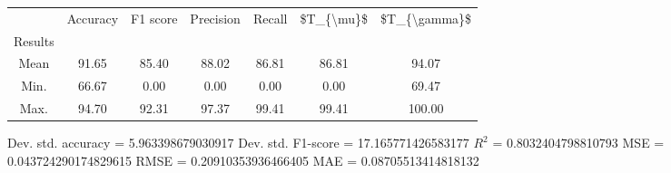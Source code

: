 \begin{tabular}{|c|c|c|c|c|c|c|}
\toprule
{} &  Accuracy &  F1 score &  Precision &  Recall &  \$T\_\{\textbackslash mu\}\$ &  \$T\_\{\textbackslash gamma\}\$ \\
Results &           &           &            &         &            &               \\
\hline
Mean    &     91.65 &     85.40 &      88.02 &   86.81 &      86.81 &         94.07 \\
Min.    &     66.67 &      0.00 &       0.00 &    0.00 &       0.00 &         69.47 \\
Max.    &     94.70 &     92.31 &      97.37 &   99.41 &      99.41 &        100.00 \\
\bottomrule
\end{tabular}

 Dev. std. accuracy = 5.963398679030917
 Dev. std. F1-score = 17.165771426583177
 $R^2$ = 0.8032404798810793
 MSE = 0.043724290174829615
 RMSE = 0.20910353936466405
 MAE = 0.08705513414818132